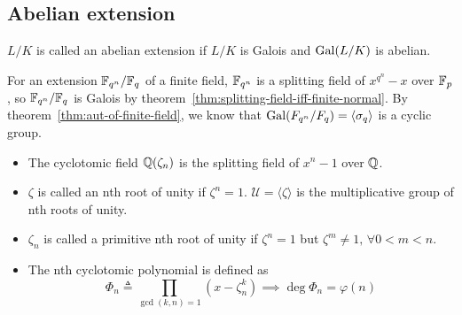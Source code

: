 \subsection{Abelian extension}

\begin{definition}
  $L/K$ is called an abelian extension if $L/K$ is Galois and $\operatorname{Gal}(L/K)$ is abelian.
\end{definition}

\begin{example}
  For an extension $\mathbb{F}_{q^n} / \mathbb{F}_q$ of a finite field, $\mathbb{F}_{q^n}$ is a splitting field of $x^{q^n}-x$
  over $\mathbb{F}_p$, so $\mathbb{F}_{q^n} / \mathbb{F}_q$ is Galois by theorem~\ref{thm:splitting-field-iff-finite-normal}.
  By theorem~\ref{thm:aut-of-finite-field}, we know that $\operatorname{Gal}(F_{q^n} / F_q) = \langle \sigma_q \rangle$
  is a cyclic group.
\end{example}

\begin{definition} \hfill
  \begin{itemize}
    \item The cyclotomic field $\mathbb{Q}(\zeta_n)$ is the splitting field of $x^n - 1$ over $\mathbb{Q}$.
    \item $\zeta$ is called an nth root of unity if $\zeta^n = 1$. $\mathcal{U} = \langle \zeta \rangle$
      is the multiplicative group of nth roots of unity.
    \item $\zeta_n$ is called a primitive nth root of unity if $\zeta^n = 1$ but $\zeta^m \ne 1, \, \forall 0 < m < n$.
    \item The nth cyclotomic polynomial is defined as
      \[ \Phi_n \triangleq \prod_{\gcd(k, n) = 1} (x - \zeta_n^k) \implies \deg \Phi_n = \varphi(n) \]
  \end{itemize}
\end{definition}

